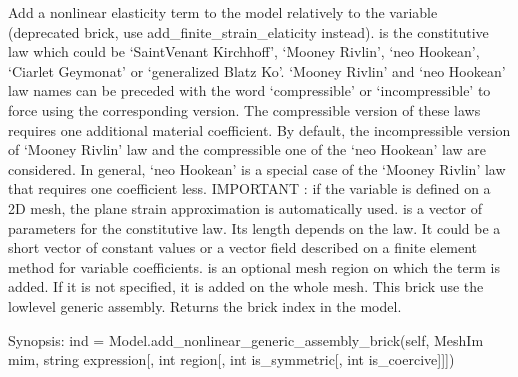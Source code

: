 \documentclass[a4paper,11pt,english]{sphinxmanual}
\begin{document}
\begin{fulllineitems}
\begin{fulllineitems}
\end{fulllineitems}


\begin{fulllineitems}
\label{\detokenize{python/cmdref_Model:getfem.Model.add_nonlinear_elasticity_brick}}
Add a nonlinear elasticity term to the model relatively to the
variable  (deprecated brick, use add\_finite\_strain\_elaticity
instead).  is the constitutive law which
could be ‘SaintVenant Kirchhoff’, ‘Mooney Rivlin’, ‘neo Hookean’,
‘Ciarlet Geymonat’ or ‘generalized Blatz Ko’.
‘Mooney Rivlin’ and ‘neo Hookean’ law names can be preceded with the word
‘compressible’ or ‘incompressible’ to force using the corresponding version.
The compressible version of these laws requires one additional material
coefficient. By default, the incompressible version of ‘Mooney Rivlin’ law
and the compressible one of the ‘neo Hookean’ law are considered. In
general, ‘neo Hookean’ is a special case of the ‘Mooney Rivlin’ law that
requires one coefficient less.
IMPORTANT : if the variable is defined on a 2D mesh, the plane strain
approximation is automatically used.
 is a vector of parameters for the constitutive law. Its length
depends on the law. It could be a short vector of constant values or a
vector field described on a finite element method for variable
coefficients.  is an optional mesh region on which the term
is added. If it is not specified, it is added on the whole mesh.
This brick use the low\sphinxhyphen{}level generic assembly.
Returns the brick index in the model.

\end{fulllineitems}


\begin{fulllineitems}
\label{\detokenize{python/cmdref_Model:getfem.Model.add_nonlinear_generic_assembly_brick}}
Synopsis: ind = Model.add\_nonlinear\_generic\_assembly\_brick(self, MeshIm mim, string expression{[}, int region{[}, int is\_symmetric{[}, int is\_coercive{]}{]}{]})


\end{fulllineitems}
\end{fulllineitems}
\end{document}

